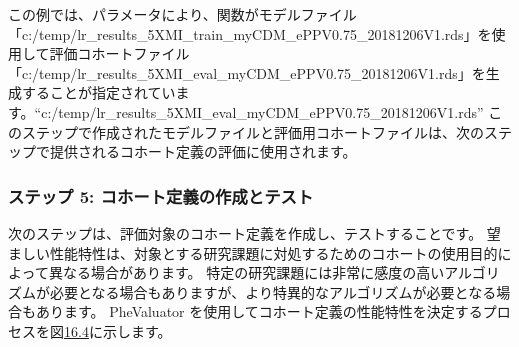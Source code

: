 \documentclass[
  11pt]{book}
\theoremstyle{definition}
\theoremstyle{definition}
\theoremstyle{definition}
\theoremstyle{definition}
\theoremstyle{remark}
\begin{document}
この例では、パラメータにより、関数がモデルファイル「c:/temp/lr\_results\_5XMI\_train\_myCDM\_ePPV0.75\_20181206V1.rds」を使用して評価コホートファイル「c:/temp/lr\_results\_5XMI\_eval\_myCDM\_ePPV0.75\_20181206V1.rds」を生成することが指定されています。``c:/temp/lr\_results\_5XMI\_eval\_myCDM\_ePPV0.75\_20181206V1.rds'' このステップで作成されたモデルファイルと評価用コホートファイルは、次のステップで提供されるコホート定義の評価に使用されます。

\subsubsection*{ステップ 5: コホート定義の作成とテスト}\label{ux30b9ux30c6ux30c3ux30d7-5-ux30b3ux30dbux30fcux30c8ux5b9aux7fa9ux306eux4f5cux6210ux3068ux30c6ux30b9ux30c8}

次のステップは、評価対象のコホート定義を作成し、テストすることです。 望ましい性能特性は、対象とする研究課題に対処するためのコホートの使用目的によって異なる場合があります。 特定の研究課題には非常に感度の高いアルゴリズムが必要となる場合もありますが、より特異的なアルゴリズムが必要となる場合もあります。 PheValuator を使用してコホート定義の性能特性を決定するプロセスを図\href{https://ohdsi.github.io/TheBookOfOhdsi/ClinicalValidity.html\#fig:phevaluatorDiagram}{16.4}に示します。
\end{document}
